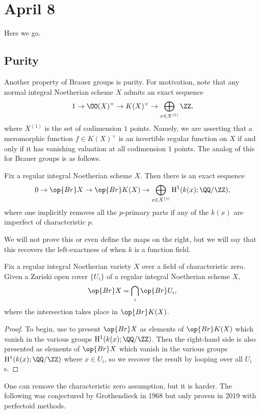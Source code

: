 \documentclass[../notes.tex]{subfiles}
\begin{document}
\section{April 8}
Here we go.

\subsection{Purity}
Another property of Brauer groups is purity. For motivation, note that any normal integral Noetherian scheme $X$ admits an exact sequence
\[1\to\OO(X)^\times\to K(X)^\times\to\bigoplus_{x\in X^{(1)}}\ZZ,\]
where $X^{(1)}$ is the set of codimension $1$ points. Namely, we are asserting that a meromorphic function $f\in K(X)^\times$ is an invertible regular function on $X$ if and only if it has vanishing valuation at all codimension $1$ points. The analog of this for Brauer groups is as follows.
\begin{theorem} \label{thm:harthog-for-brauer}
	Fix a regular integral Noetherian scheme $X$. Then there is an exact sequence
	\[0\to\op{Br}X\to\op{Br}K(X)\to\bigoplus_{x\in X^{(1)}}\mathrm H^1(k(x);\QQ/\ZZ),\]
	where one implicitly removes all the $p$-primary parts if any of the $k(x)$ are imperfect of characteristic $p$.
\end{theorem}
\begin{remark}
	We will not prove this or even define the maps on the right, but we will say that this recovers the left-exactness of  when $k$ is a function field.
\end{remark}
\begin{corollary} \label{cor:extend-brauer}
	Fix a regular integral Noetherian variety $X$ over a field of characteristic zero. Given a Zariski open cover $\{U_i\}$ of a regular integral Noetherian scheme $X$,
	\[\op{Br}X=\bigcap_i\op{Br}U_i,\]
	where the intersection takes place in $\op{Br}K(X)$.
\end{corollary}
\begin{proof}
	To begin, use  to present $\op{Br}X$ as elements of $\op{Br}K(X)$ which vanish in the various groups $\mathrm H^1(k(x);\QQ/\ZZ)$. Then the right-hand side is also presented as elements of $\op{Br}X$ which vanish in the various groups $\mathrm H^1(k(x);\QQ/\ZZ)$ where $x\in U_i$, so we recover the result by looping over all $U_i$s.
\end{proof}
One can remove the characteristic zero assumption, but it is harder. The following was conjectured by Grothendieck in 1968 but only proven in 2019 with perfectoid methods.
\end{document}
